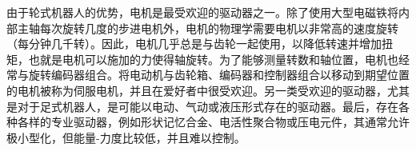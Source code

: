 
由于轮式机器人的优势，电机是最受欢迎的驱动器之一。除了使用大型电磁铁将内部主轴每次旋转几度的步进电机外，电机的物理学需要电机以非常高的速度旋转（每分钟几千转）。因此，电机几乎总是与齿轮一起使用，以降低转速并增加扭矩，也就是电机可以施加的力使得轴旋转。为了能够测量转数和轴位置，电机也经常与旋转编码器组合。将电动机与齿轮箱、编码器和控制器组合以移动到期望位置的电机被称为伺服电机，并且在爱好者中很受欢迎。另一类受欢迎的驱动器，尤其是对于足式机器人，是可能以电动、气动或液压形式存在的驱动器。最后，存在各种各样的专业驱动器，例如形状记忆合金、电活性聚合物或压电元件，其通常允许极小型化，但能量-力度比较低，并且难以控制。


